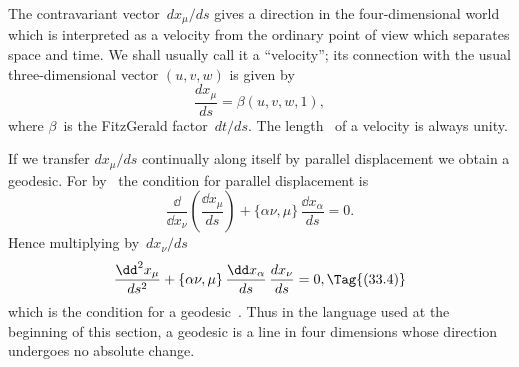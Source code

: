 \documentclass[12pt]{book}
\begin{document}
The contravariant vector~$dx_{\mu}/ds$ gives a direction in the four\hyp{}dimensional
world which is interpreted as a velocity from the ordinary point of view which
separates space and time. We shall usually call it a ``velocity''; its connection
with the usual three\hyp{}dimensional vector $(u, v, w)$ is given by
\[
\frac{dx_{\mu}}{ds} = \beta(u, v, w, 1),
\]
where $\beta$~is the FitzGerald factor~$dt/ds$. The length~ of a velocity is
always unity.

If we transfer $dx_{\mu}/ds$ continually along itself by parallel displacement we
obtain a geodesic. For by~ the condition for parallel displacement is
\[
\frac{\dd}{\dd x_{\nu}} \left(\frac{\dd x_{\mu}}{ds}\right) + \{\alpha\nu, \mu\}\, \frac{\dd x_{\alpha}}{ds} = 0.
\]
Hence multiplying by~$dx_{\nu}/ds$
\[
\frac{\dd^{2} x_{\mu}}{ds^{2}} + \{\alpha\nu, \mu\}\, \frac{\dd x_{\alpha}}{ds}\, \frac{dx_{\nu}}{ds} = 0,
\Tag{(33.4)}
\]
which is the condition for a geodesic~. Thus in the language used at
the beginning of this section, a geodesic is a line in four dimensions whose
direction undergoes no absolute change.

\end{document}

